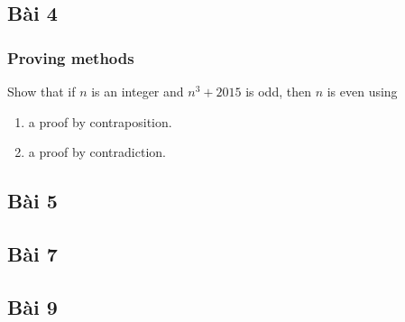 \documentclass[english,10pt,table]{beamer}
\begin{document}
\subsection{Bài 4}
\frame
{
  \frametitle{Proving methods}	
\begin{block}{}
Show that if $n$ is an integer and $n^3 + 2015$ is odd, then $n$ is even using
\begin{enumerate}[a]
\item a proof by contraposition.
\item a proof by contradiction.
\end{enumerate}
\end{block}
}


\subsection{Bài 5}
\frame{}
\subsection{Bài 7}
\frame{}
\subsection{Bài 9}
\frame{}
\end{document}
